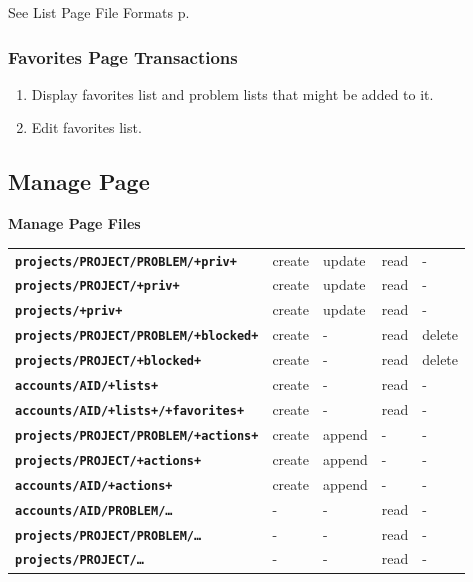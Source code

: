 \documentclass[12pt]{article}
\newenvironment{indpar}[1][0.4in]%
	{\begin{list}{}%
		     {\setlength{\itemsep}{0in}%
		      \setlength{\topsep}{0in}%
		      \setlength{\parsep}{1ex}%
		      \setlength{\labelwidth}{#1}%
		      \setlength{\leftmargin}{#1}%
		      \addtolength{\leftmargin}{\labelsep}}%
	 \item}%
	{\end{list}}
\newcommand{\TT}[1]{{\tt \bfseries #1}}
\newcommand{\pagref}[1]{p\pageref{#1}}
\begin{document}
\begin{indpar}
See List Page File Formats \pagref{LIST-PAGE-FILE-FORMATS}.
\end{indpar}

\subsubsection{Favorites Page Transactions}

\begin{enumerate}
\item Display favorites list and problem lists that might be added to it.
\item Edit favorites list.
\end{enumerate}

\newpage

\subsection{Manage Page}

\begin{center}

{\bf Manage Page Files}

\begin{tabular}{lllll}
\TT{projects/PROJECT/PROBLEM/+priv+}   	& create  & update & read & - \\
\TT{projects/PROJECT/+priv+}    	& create  & update & read & - \\
\TT{projects/+priv+}    		& create  & update & read & - \\
\TT{projects/PROJECT/PROBLEM/+blocked+}	& create  & -      & read & delete \\
\TT{projects/PROJECT/+blocked+}    	& create  & -      & read & delete \\
\TT{accounts/AID/+lists+}    		& create  & -	   & read & - \\
\TT{accounts/AID/+lists+/+favorites+}  	& create  & -	   & read & - \\
\TT{projects/PROJECT/PROBLEM/+actions+} & create  & append & -    & - \\
\TT{projects/PROJECT/+actions+}    	& create  & append & -    & - \\
\TT{accounts/AID/+actions+}    		& create  & append & -    & - \\
\TT{accounts/AID/PROBLEM/\ldots}    	& -	  & -	   & read & - \\
\TT{projects/PROJECT/PROBLEM/\ldots}    & -	  & -	   & read & - \\
\TT{projects/PROJECT/\ldots}    	& -	  & -	   & read & - \\
\end{tabular}


\end{center}
\end{document}
